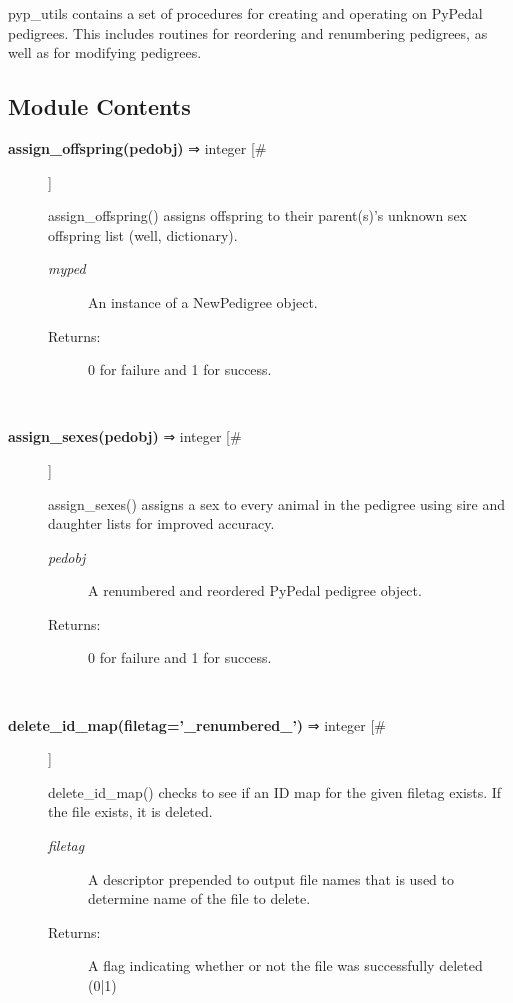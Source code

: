 

 pyp\_utils contains a set of procedures for creating and operating on PyPedal pedigrees. This includes routines for reordering and renumbering pedigrees, as well as for modifying pedigrees.
\subsection*{Module Contents}
\begin{description}
\item[\textbf{assign\_offspring(pedobj)}
 ⇒ integer [\#]]

 assign\_offspring() assigns offspring to their parent(s)'s unknown sex offspring list (well, dictionary).
\begin{description}
\item[\emph{myped}
] An instance of a NewPedigree object.
\item[Returns:] 0 for failure and 1 for success.

\end{description}
\\ 

\item[\textbf{assign\_sexes(pedobj)}
 ⇒ integer [\#]]

 assign\_sexes() assigns a sex to every animal in the pedigree using sire and daughter lists for improved accuracy.
\begin{description}
\item[\emph{pedobj}
] A renumbered and reordered PyPedal pedigree object.
\item[Returns:] 0 for failure and 1 for success.

\end{description}
\\ 

\item[\textbf{delete\_id\_map(filetag='\_renumbered\_')}
 ⇒ integer [\#]]

 delete\_id\_map() checks to see if an ID map for the given filetag exists. If the file exists, it is deleted.
\begin{description}
\item[\emph{filetag}
] A descriptor prepended to output file names that is used to determine name of the file to delete.
\item[Returns:] A flag indicating whether or not the file was successfully deleted (0|1)

\end{description}
\\ 


\end{description}
